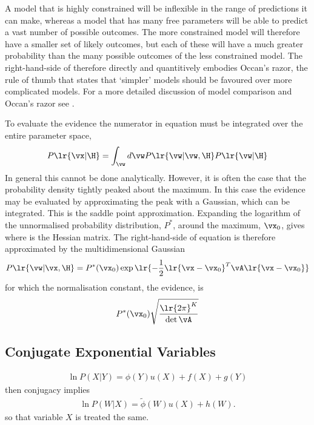 {A model that is highly constrained will be inflexible in the range of predictions it can make,
whereas a model that has many free parameters will be able to predict a vast number of possible outcomes.
The more constrained model will therefore have a smaller set of likely outcomes,
but each of these will have a much greater probability than the many possible outcomes of the less constrained model.
The right-hand-side of  therefore directly and quantitively embodies Occan's razor,
the rule of thumb that states that `simpler' models should be favoured over more complicated models.
For a more detailed discussion of model comparison and Occan's razor see \cite[Chapter 28]{Mackay2003}.

To evaluate the evidence the numerator in equation  must be integrated over the entire parameter space,
\begin{align}
  P\lr{\vx|\H} = \int_\vw d\vw P\lr{\vw|\vw,\H} P\lr{\vw|\H}
\end{align}
In general this cannot be done analytically.
However, it is often the case that the probability density tightly peaked about the maximum.
In this case the evidence may be evaluated by approximating the peak with a Gaussian, which can be integrated.
This is the saddle point approximation.
Expanding the logarithm of the  unnormalised probability distribution, $P^\ast$, 
around the maximum, $\vx_0$,
gives
where 
is the Hessian matrix.
The right-hand-side of equation   is therefore approximated by the multidimensional Gaussian
\begin{align}
   P\lr{\vw|\vx,\H} = P^\ast(\vx_0) \exp \lr{- \frac{1}{2}\lr{\vx-\vx_0}^T \vA\lr{\vx-\vx_0 }}
\end{align}
for which the normalisation constant, the evidence, is 
\begin{align}
   P^\ast(\vx_0) \sqrt{\frac{\lr{2\pi}^K}{\det \vA}}
\end{align}


\subsection{Conjugate Exponential Variables}
\begin{align}
\ln P(X|Y) = \phi(Y) u(X) + f(X) + g(Y)
\end{align}
then conjugacy implies
\begin{align}
\ln P(W|X) = \tilde\phi(W) u(X) + h(W).
\end{align}
so that variable $X$ is treated the same.


}
